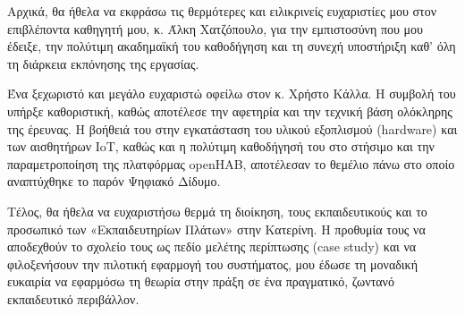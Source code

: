 Αρχικά, θα ήθελα να εκφράσω τις θερμότερες και ειλικρινείς ευχαριστίες μου στον επιβλέποντα καθηγητή μου,
κ. Άλκη Χατζόπουλο, για την εμπιστοσύνη που μου έδειξε, την πολύτιμη ακαδημαϊκή του καθοδήγηση και τη συνεχή
υποστήριξη καθ' όλη τη διάρκεια εκπόνησης της εργασίας.

Ένα ξεχωριστό και μεγάλο ευχαριστώ οφείλω στον κ. Χρήστο Κάλλα. Η συμβολή του υπήρξε καθοριστική, καθώς
αποτέλεσε την αφετηρία και την τεχνική βάση ολόκληρης της έρευνας. Η βοήθειά του στην εγκατάσταση του υλικού
εξοπλισμού (\textlatin{hardware}) και των αισθητήρων \textlatin{IoT}, καθώς και η πολύτιμη καθοδήγησή του στο στήσιμο και την
παραμετροποίηση της πλατφόρμας \textlatin{openHAB}, αποτέλεσαν το θεμέλιο πάνω στο οποίο αναπτύχθηκε το παρόν Ψηφιακό
Δίδυμο.

Τέλος, θα ήθελα να ευχαριστήσω θερμά τη διοίκηση, τους εκπαιδευτικούς και το προσωπικό των «Εκπαιδευτηρίων
Πλάτων» στην Κατερίνη. Η προθυμία τους να αποδεχθούν το σχολείο τους ως πεδίο μελέτης περίπτωσης
(\textlatin{case study}) και να φιλοξενήσουν την πιλοτική εφαρμογή του συστήματος, μου έδωσε τη μοναδική ευκαιρία να
εφαρμόσω τη θεωρία στην πράξη σε ένα πραγματικό, ζωντανό εκπαιδευτικό περιβάλλον.

\clearpage
